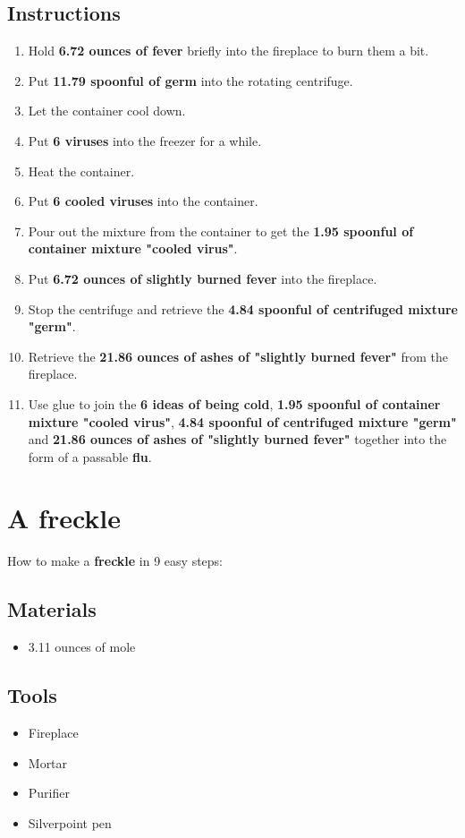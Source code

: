 \documentclass{article}
\begin{document}
\subsection{Instructions}\begin{enumerate}
\item 
Hold \textbf{6.72 ounces of fever} briefly into the fireplace to burn them a bit.
\item 
Put \textbf{11.79 spoonful of germ} into the rotating centrifuge.
\item 
Let the container cool down.
\item 
Put \textbf{6 viruses} into the freezer for a while.
\item 
Heat the container.
\item 
Put \textbf{6 cooled viruses} into the container.
\item 
Pour out the mixture from the container to get the \textbf{1.95 spoonful of container mixture "cooled virus"}.
\item 
Put \textbf{6.72 ounces of slightly burned fever} into the fireplace.
\item 
Stop the centrifuge and retrieve the \textbf{4.84 spoonful of centrifuged mixture "germ"}.
\item 
Retrieve the \textbf{21.86 ounces of ashes of "slightly burned fever"} from the fireplace.
\item 
Use glue to join the \textbf{6 ideas of being cold}, \textbf{1.95 spoonful of container mixture "cooled virus"}, \textbf{4.84 spoonful of centrifuged mixture "germ"} and \textbf{21.86 ounces of ashes of "slightly burned fever"} together into the form of a passable \textbf{flu}.
\end{enumerate}
\newpage
\section{A freckle}How to make a \textbf{freckle} in 9 easy steps:

\subsection{Materials}\begin{itemize}
\item 
3.11 ounces of mole
\end{itemize}
\subsection{Tools}\begin{itemize}
\item 
Fireplace
\item 
Mortar
\item 
Purifier
\item 
Silverpoint pen
\end{itemize}
\end{document}
